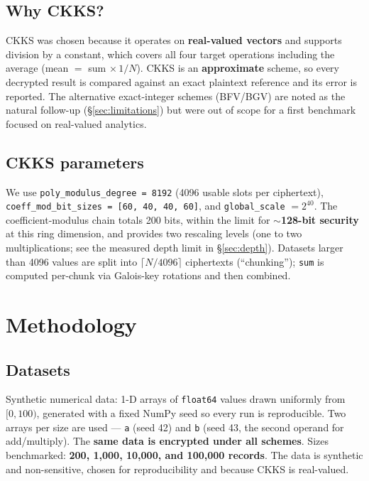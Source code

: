 \documentclass[11pt,a4paper]{article}
\begin{document}
\subsection{Why CKKS?}

CKKS was chosen because it operates on \textbf{real-valued vectors} and supports
division by a constant, which covers all four target operations including the
average (mean $=$ sum $\times\,1/N$). CKKS is an \textbf{approximate} scheme, so
every decrypted result is compared against an exact plaintext reference and its
error is reported. The alternative exact-integer schemes (BFV/BGV) are noted as
the natural follow-up (\S\ref{sec:limitations}) but were out of scope for a first
benchmark focused on real-valued analytics.

\subsection{CKKS parameters}
\label{sec:params}

We use \texttt{poly\_modulus\_degree = 8192} (4096 usable slots per ciphertext),
\texttt{coeff\_mod\_bit\_sizes = [60, 40, 40, 60]}, and
\texttt{global\_scale} $=2^{40}$. The coefficient-modulus chain totals 200 bits,
within the limit for $\sim$\textbf{128-bit security} at this ring dimension, and
provides two rescaling levels (one to two multiplications; see the measured depth
limit in \S\ref{sec:depth}). Datasets larger than 4096 values are split into
$\lceil N/4096\rceil$ ciphertexts (``chunking''); \texttt{sum} is computed
per-chunk via Galois-key rotations and then combined.

\section{Methodology}
\label{sec:methodology}

\subsection{Datasets}

Synthetic numerical data: 1-D arrays of \texttt{float64} values drawn uniformly
from $[0, 100)$, generated with a fixed NumPy seed so every run is reproducible.
Two arrays per size are used --- \texttt{a} (seed 42) and \texttt{b} (seed 43,
the second operand for add/multiply). The \textbf{same data is encrypted under
all schemes}. Sizes benchmarked: \textbf{200, 1{,}000, 10{,}000, and
100{,}000 records}. The data is synthetic and non-sensitive, chosen for
reproducibility and because CKKS is real-valued.
\end{document}
